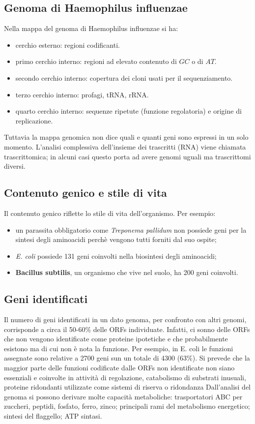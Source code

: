 	\subsection{Genoma di Haemophilus influenzae}
	Nella mappa del genoma di Haemophilus influenzae si ha:
	\begin{multicols}{2}
	\begin{itemize}
    		\item cerchio esterno: regioni codificanti.
    		\item primo cerchio interno: regioni ad elevato contenuto di $GC$ o di $AT$.
    		\item secondo cerchio interno: copertura dei cloni usati per il sequenziamento.
    		\item terzo cerchio interno: profagi, tRNA, rRNA.
    		\item quarto cerchio interno: sequenze ripetute (funzione regolatoria) e origine di replicazione.
	\end{itemize}
	\end{multicols}
	Tuttavia la mappa genomica non dice quali e quanti geni sono espressi in un solo momento. 
	L'analisi complessiva dell'insieme dei trascritti (RNA) viene chiamata trascrittomica; in alcuni casi questo porta ad avere genomi uguali ma trascrittomi diversi. 

	\subsection{Contenuto genico e stile di vita}
	Il contenuto genico riflette lo stile di vita dell'organismo. 
	Per esempio:
	\begin{itemize}
	    	\item un parassita obbligatorio come \textit{Treponema pallidum} non possiede geni per la sintesi degli aminoacidi perch\`e vengono tutti forniti dal suo ospite;
	    	\item \textit{E. coli} possiede 131 geni coinvolti nella biosintesi degli aminoacidi;
    		\item \textbf{Bacillus subtilis}, un organismo che vive nel suolo, ha 200 geni coinvolti.
	\end{itemize}

	\subsection{Geni identificati}
	Il numero di geni identificati in un dato genoma, per confronto con altri genomi, corrisponde a circa il 50-60$\%$ delle ORFs individuate.
	Infatti, ci sonno delle ORFs che non vengono identificate come proteine ipotetiche e che probabilmente esistono ma di cui non \`e nota la funzione. 
	Per esempio, in E. coli le funzioni assegnate sono relative a 2700 geni sun un totale di 4300 (63$\%$). 
	Si prevede che la maggior parte delle funzioni codificate dalle ORFs non identificate non siano essenziali e coinvolte in attivit\`a di regolazione, catabolismo di substrati inusuali, proteine ridondanti utilizzate come sistemi di riserva o ridondanza
	Dall'analisi del genoma si possono derivare molte capacit\`a metaboliche: trasportatori ABC per zuccheri, peptidi, fosfato, ferro, zinco; principali rami del metabolismo energetico; sintesi del flaggello; ATP sintasi.

